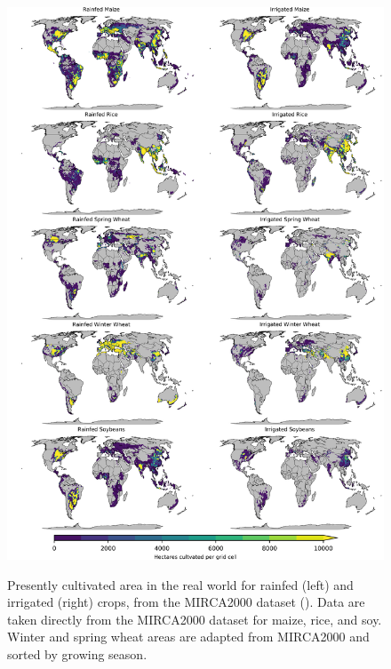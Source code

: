 \documentclass[12pt]{article}
\begin{document}
\clearpage
\begin{figure}[h!]
    \centering
    \includegraphics[width=14cm]{cult_area.png}\\
    \caption{
    Presently cultivated area in the real world for rainfed (left) and irrigated (right) crops, from the MIRCA2000 dataset (\cite{Portmann2010}). 
    Data are taken directly from the MIRCA2000 dataset  for maize, rice, and soy. 
    Winter and spring wheat areas are adapted from MIRCA2000 and sorted by growing season.
    }
    \label{fig:irrarea}
\end{figure}

\clearpage
\end{document}
